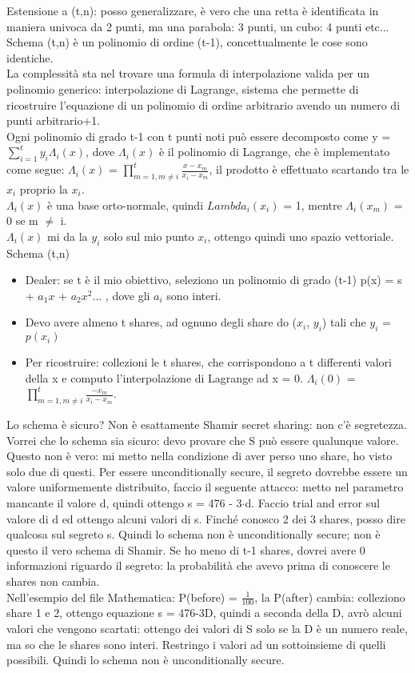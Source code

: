 \documentclass[16px]{article}
\begin{document}
Estensione a (t,n): posso generalizzare, è vero che una retta è identificata in maniera univoca da 2 punti, ma una parabola: 3 punti, un cubo: 4 punti etc...\\ Schema (t,n) è un polinomio di ordine (t-1), concettualmente le cose sono identiche.\\ La complessità sta nel trovare una formula di interpolazione valida per un polinomio generico: interpolazione di Lagrange, sistema che permette di ricostruire l'equazione di un polinomio di ordine arbitrario avendo un numero di punti arbitrario+1.\\ Ogni polinomio di grado t-1 con t punti noti può essere decomposto come y = $\sum\limits_{i = 1}^{t} y_i\Lambda_i(x)$, dove $\Lambda_i(x)$ è il polinomio di Lagrange, che è implementato come segue: $\Lambda_i(x)$ = $\prod\limits_{m = 1, m \neq i}^{t} \frac{x - x_m}{x_i - x_m}$, il prodotto è effettuato scartando tra le $x_i$ proprio la $x_i$.\\ $\Lambda_i(x)$ è una base orto-normale, quindi $Lambda_i(x_i)$ = 1, mentre $\Lambda_i(x_m)$ = 0 se m $\neq$ i.\\ $\Lambda_i(x)$ mi da la $y_i$ solo sul mio punto $x_i$, ottengo quindi uno spazio vettoriale.\\ Schema (t,n)
\begin{itemize}
\item Dealer: se t è il mio obiettivo, seleziono un polinomio di grado (t-1) p(x) = s + $a_1x$ + $a_2x^2$... , dove gli $a_i$ sono interi.
\item Devo avere almeno t shares, ad ognuno degli share do ($x_i$, $y_i$) tali che $y_i$ = $p(x_i)$
\item Per ricostruire: collezioni le t shares, che corrispondono a t differenti valori della x e computo l'interpolazione di Lagrange ad x = 0. $\Lambda_i(0)$ = $\prod\limits_{m = 1, m \neq i}^{t} \frac{- x_m}{x_i - x_m}$.
\end{itemize}
Lo schema è sicuro? Non è esattamente Shamir secret sharing: non c'è segretezza. Vorrei che lo schema sia sicuro: devo provare che S può essere qualunque valore. Questo non è vero: mi metto nella condizione di aver perso uno share, ho visto solo due di questi. Per essere unconditionally secure, il segreto dovrebbe essere un valore uniformemente distribuito, faccio il seguente attacco: metto nel parametro mancante il valore d, quindi ottengo s = 476  - 3$\cdot$d. Faccio trial and error sul valore di d ed ottengo alcuni valori di s. Finché conosco 2 dei 3 shares, posso dire qualcosa sul segreto s. Quindi lo schema non è unconditionally secure; non è questo il vero schema di Shamir. Se ho meno di t-1 shares, dovrei avere 0 informazioni riguardo il segreto: la probabilità che avevo prima di conoscere le shares non cambia.\\ Nell'esempio del file Mathematica: P(before) = $\frac{1}{100}$, la P(after) cambia: colleziono share 1 e 2, ottengo equazione s = 476-3D, quindi a seconda della D, avrò alcuni valori che vengono scartati: ottengo dei valori di S solo se la D è un numero reale, ma so che le shares sono interi. Restringo i valori ad un sottoinsieme di quelli possibili. Quindi lo schema non è unconditionally secure.
\end{document}
